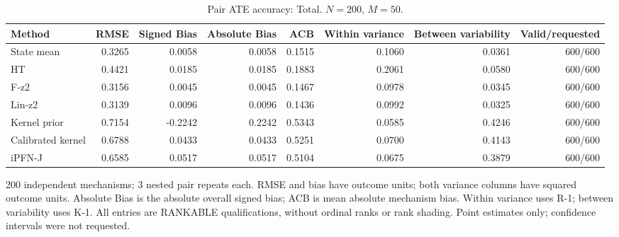 \begin{table}[tb]
\centering
\scriptsize
\caption{Pair ATE accuracy: Total. $N=200$, $M=50$.}
\begin{tabular}{lrrrrrrr}
\toprule
Method & RMSE & Signed Bias & Absolute Bias & ACB & Within variance & Between variability & Valid/requested \\
\midrule
State mean & 0.3265 & 0.0058 & 0.0058 & 0.1515 & 0.1060 & 0.0361 & 600/600 \\
HT & 0.4421 & 0.0185 & 0.0185 & 0.1883 & 0.2061 & 0.0580 & 600/600 \\
F-z2 & 0.3156 & 0.0045 & 0.0045 & 0.1467 & 0.0978 & 0.0345 & 600/600 \\
Lin-z2 & 0.3139 & 0.0096 & 0.0096 & 0.1436 & 0.0992 & 0.0325 & 600/600 \\
Kernel prior & 0.7154 & -0.2242 & 0.2242 & 0.5343 & 0.0585 & 0.4246 & 600/600 \\
Calibrated kernel & 0.6788 & 0.0433 & 0.0433 & 0.5251 & 0.0700 & 0.4143 & 600/600 \\
iPFN-J & 0.6585 & 0.0517 & 0.0517 & 0.5104 & 0.0675 & 0.3879 & 600/600 \\
\bottomrule
\end{tabular}
\par\smallskip\begin{minipage}{\linewidth}\scriptsize
200 independent mechanisms; 3 nested pair repeats each. RMSE and bias have outcome units; both variance columns have squared outcome units. Absolute Bias is the absolute overall signed bias; ACB is mean absolute mechanism bias. Within variance uses R-1; between variability uses K-1. All entries are RANKABLE qualifications, without ordinal ranks or rank shading. Point estimates only; confidence intervals were not requested.
\end{minipage}\end{table}
